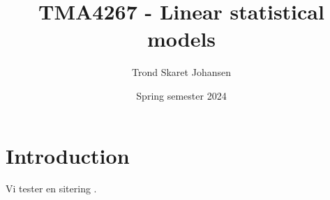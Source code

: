 \documentclass[12pt, letterpaper]{article}
\title{TMA4267 - Linear statistical models}
\date{Spring semester 2024}
\author{Trond Skaret Johansen}
\begin{document}
\maketitle
\tableofcontents
\newpage

\section*{Introduction} 

\label{sec:introduction}


\newpage






Vi tester en sitering \cite{test}.

\newpage\printbibliography{}
\newpage\printindex{}
\end{document}
